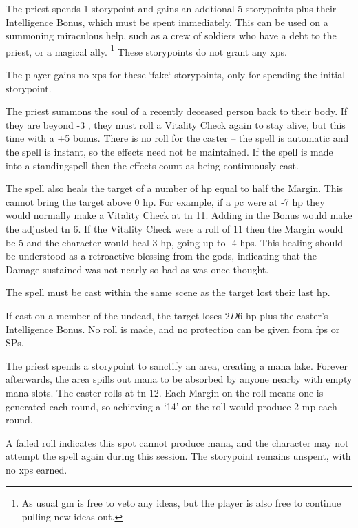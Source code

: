 \begin{multicols}{2}
\spelllevel


The priest spends 1 \gls{storypoint} and gains an addtional 5 \glspl{storypoint} plus their Intelligence Bonus, which must be spent immediately.
This can be used on a summoning miraculous help, such as a crew of soldiers who have a debt to the priest, or a magical ally.%
\footnote{As usual \gls{gm} is free to veto any ideas, but the player is also free to continue pulling new ideas out.}
These \glspl{storypoint} do not grant any \glspl{xp}.

The player gains no \glspl{xp} for these `fake` \glspl{storypoint}, only for spending the initial \gls{storypoint}.


The priest summons the soul of a recently deceased person back to their body.
If they are beyond -3 , they must roll a Vitality Check again to stay alive, but this time with a +5 bonus.
There is no roll for the caster -- the spell is automatic and the spell is instant, so the effects need not be maintained.
If the spell is made into a \gls{standingspell} then the effects count as being continuously cast.

The spell also heals the target of a number of \gls{hp} equal to half the Margin.
This cannot bring the target above 0 \gls{hp}.
For example, if a \gls{pc} were at -7 \gls{hp} they would normally make a Vitality Check at \gls{tn} 11.
Adding in the Bonus would make the adjusted \gls{tn} 6.
If the Vitality Check were a roll of 11 then the Margin would be 5 and the character would heal 3 \gls{hp}, going up to -4 \glspl{hp}.
This healing should be understood as a retroactive blessing from the gods, indicating that the Damage sustained was not nearly so bad as was once thought.

The spell must be cast within the same scene as the target lost their last \gls{hp}.

If cast on a member of the undead, the target loses $2D6$ \gls{hp} plus the caster's Intelligence Bonus.
No roll is made, and no protection can be given from \glspl{fp} or \glspl{SP}.


The priest spends a \gls{storypoint} to sanctify an area, creating a mana lake.
Forever afterwards, the area spills out mana to be absorbed by anyone nearby with empty mana slots.
The caster rolls at \gls{tn} 12.
Each Margin on the roll means one  is generated each round, so achieving a `14' on the roll would produce 2 \gls{mp} each round.

A failed roll indicates this spot cannot produce mana, and the character may not attempt the spell again during this session.
The \gls{storypoint} remains unspent, with no \glspl{xp} earned.

\end{multicols}

